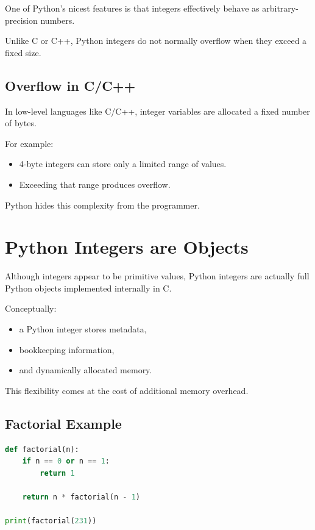 \documentclass[11pt]{article}
\begin{document}
One of Python's nicest features is that integers effectively behave as arbitrary-precision numbers.

Unlike C or C++, Python integers do not normally overflow when they exceed a fixed size.

\subsection{Overflow in C/C++}

In low-level languages like C/C++, integer variables are allocated a fixed number of bytes.

For example:

\begin{itemize}
    \item 4-byte integers can store only a limited range of values.
    \item Exceeding that range produces overflow.
\end{itemize}

Python hides this complexity from the programmer.

\section{Python Integers are Objects}

Although integers appear to be primitive values, Python integers are actually full Python objects implemented internally in C.

Conceptually:

\begin{itemize}
    \item a Python integer stores metadata,
    \item bookkeeping information,
    \item and dynamically allocated memory.
\end{itemize}

This flexibility comes at the cost of additional memory overhead.

\subsection{Factorial Example}

\begin{lstlisting}[language=Python]
def factorial(n):
    if n == 0 or n == 1:
        return 1

    return n * factorial(n - 1)

print(factorial(231))
\end{lstlisting}
\end{document}

